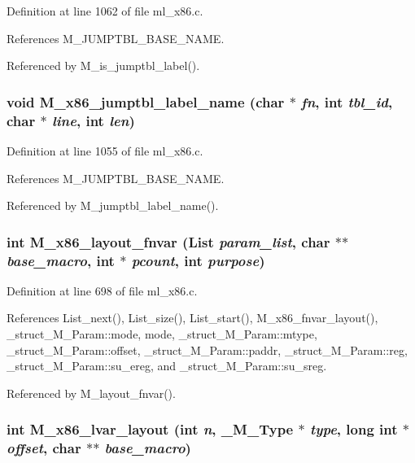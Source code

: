 Definition at line 1062 of file ml\_\-x86.c.

References M\_\-JUMPTBL\_\-BASE\_\-NAME.

Referenced by M\_\-is\_\-jumptbl\_\-label().
\subsubsection{\setlength{\rightskip}{0pt plus 5cm}void M\_\-x86\_\-jumptbl\_\-label\_\-name (char $\ast$ {\em fn}, int {\em tbl\_\-id}, char $\ast$ {\em line}, int {\em len})}\label{ml__x86_8c_4086f964a0c1e87878b6a60ea52c1540}




Definition at line 1055 of file ml\_\-x86.c.

References M\_\-JUMPTBL\_\-BASE\_\-NAME.

Referenced by M\_\-jumptbl\_\-label\_\-name().
\subsubsection{\setlength{\rightskip}{0pt plus 5cm}int M\_\-x86\_\-layout\_\-fnvar (\bf{List} {\em param\_\-list}, char $\ast$$\ast$ {\em base\_\-macro}, int $\ast$ {\em pcount}, int {\em purpose})}\label{ml__x86_8c_a4e0ea0d585095df7ec5435f5d640656}




Definition at line 698 of file ml\_\-x86.c.

References List\_\-next(), List\_\-size(), List\_\-start(), M\_\-x86\_\-fnvar\_\-layout(), \_\-struct\_\-M\_\-Param::mode, mode, \_\-struct\_\-M\_\-Param::mtype, \_\-struct\_\-M\_\-Param::offset, \_\-struct\_\-M\_\-Param::paddr, \_\-struct\_\-M\_\-Param::reg, \_\-struct\_\-M\_\-Param::su\_\-ereg, and \_\-struct\_\-M\_\-Param::su\_\-sreg.

Referenced by M\_\-layout\_\-fnvar().
\subsubsection{\setlength{\rightskip}{0pt plus 5cm}int M\_\-x86\_\-lvar\_\-layout (int {\em n}, \bf{\_\-M\_\-Type} $\ast$ {\em type}, long int $\ast$ {\em offset}, char $\ast$$\ast$ {\em base\_\-macro})}\label{ml__x86_8c_cdbd8746178fd2d03ff8fdc78eeee4ad}




